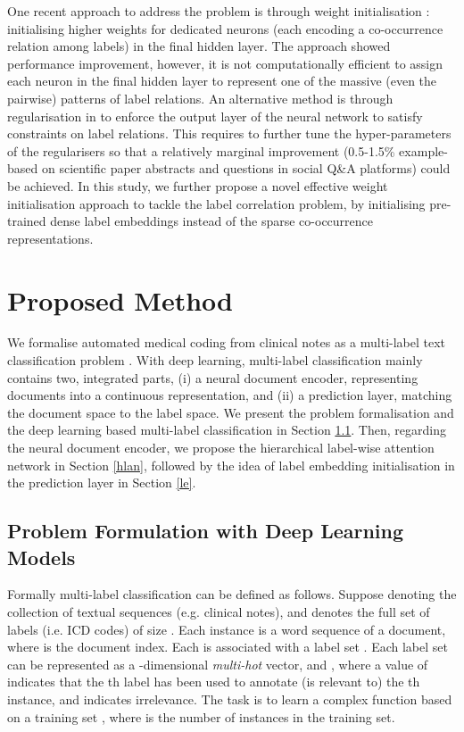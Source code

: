 \documentclass[final,5p,times,twocolumn]{elsarticle}
\begin{document}
One recent approach to address the problem is through weight initialisation \cite{kurata-etal-2016-improved,baker-korhonen-2017-initializing}: initialising higher weights for dedicated neurons (each encoding a co-occurrence relation among labels) in the final hidden layer. The approach showed performance improvement, however, it is not computationally efficient to assign each neuron in the final hidden layer to represent one of the massive (even the pairwise) patterns of label relations. An alternative method is through regularisation in \cite{dong2020} to enforce the output layer of the neural network to satisfy constraints on label relations. This requires to further tune the hyper-parameters of the regularisers so that a relatively marginal improvement (0.5-1.5\% example-based  on scientific paper abstracts and questions in social Q\&A platforms) could be achieved. In this study, we further propose a novel effective weight initialisation approach to tackle the label correlation problem, by initialising pre-trained dense label embeddings instead of the sparse co-occurrence representations.

\section{Proposed Method}
\label{method}
We formalise automated medical coding from clinical notes as a multi-label text classification problem \cite{Nam2014}. With deep learning, multi-label classification mainly contains two, integrated parts, (i) a neural document encoder, representing documents into a continuous representation, and (ii) a prediction layer, matching the document space to the label space. We present the problem formalisation and the deep learning based multi-label classification in Section \ref{problem_formulation}. Then, regarding the neural document encoder, we propose the hierarchical label-wise attention network in Section \ref{hlan}, followed by the idea of label embedding initialisation in the prediction layer in Section \ref{le}.

\subsection{Problem Formulation with Deep Learning Models}
\label{problem_formulation}
Formally multi-label classification can be defined as follows. Suppose  denoting the collection of textual sequences (e.g. clinical notes), and  denotes the full set of labels (i.e. ICD codes) of size . Each instance  is a word sequence of a document, where  is the document index. Each  is associated with a label set . Each label set  can be represented as a -dimensional \emph{multi-hot} vector,  and , where a value of  indicates that the th label  has been used to annotate (is relevant to) the th instance, and  indicates irrelevance. The task is to learn a complex function  based on a training set , where  is the number of instances in the training set.
\end{document}
